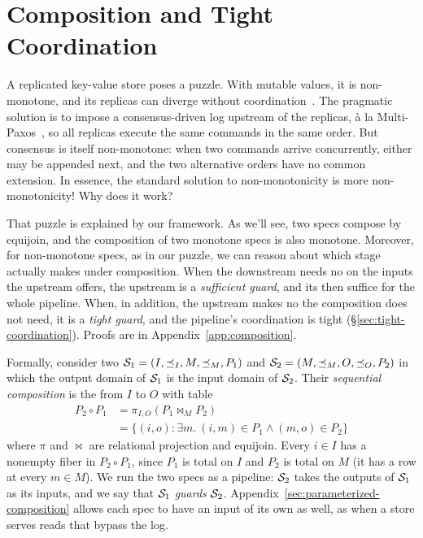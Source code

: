 \section{Composition and Tight Coordination}
\label{sec:composition}

A replicated key-value store poses a puzzle.  With mutable values, it is
non-monotone, and its replicas can diverge without coordination~\cite{alvaro2011bloom}. The pragmatic solution is
to impose a consensus-driven log upstream of the replicas, \`a la
Multi-Paxos~\cite{lamport2001paxos}, so all replicas execute the same commands
in the same order. But consensus is itself non-monotone: when two commands
arrive concurrently, either may be appended next, and the two alternative orders
have no common extension.  In essence, the standard solution to non-monotonicity
is more non-monotonicity! Why does it work?

That puzzle is explained by our framework.  As we'll see, two specs compose by equijoin,
and the composition of two monotone specs is also monotone. Moreover, for non-monotone specs,
as in our puzzle, we
can reason about which stage actually makes \commitments under composition.  When the
downstream needs no \commitment on the inputs the upstream offers, the
upstream is a \emph{sufficient guard}, and its \commitments then suffice for
the whole pipeline.  When, in addition, the upstream makes no \commitment the
composition does not need, it is a \emph{tight guard}, and the pipeline's
coordination is tight (\S\ref{sec:tight-coordination}).  Proofs are in
Appendix~\ref{app:composition}.
\label{sec:sequential-composition}

Formally, consider two \spectype[s]
${\mathcal{S}_1=(I,\preceq_I,M,\preceq_M,P_1)}$ and
${\mathcal{S}_2=(M,\preceq_M,O,\preceq_O,P_2)}$
in which the output domain of $\mathcal{S}_1$ is the input domain of $\mathcal{S}_2$.  Their
\emph{sequential composition} is the \spectype from $I$ to $O$ with table
\begin{equation}
\begin{split}
  P_2\circ P_1
  &=\pi_{I,O}(P_1\Join_M P_2)\\
  &=\{(i,o):\exists m.\ (i,m)\in P_1\land(m,o)\in P_2\}
\end{split}
  \label{eq:spec-composition}
\end{equation}
where $\pi$ and $\Join$ are relational projection and equijoin.  Every $i\in I$
has a nonempty fiber in $P_2\circ P_1$, since $P_1$ is total on $I$ and $P_2$ is
total on $M$ (it has a row at every $m\in M$).  We run the two specs as a pipeline: $\mathcal{S}_2$ takes the outputs of $\mathcal{S}_1$ as
its inputs, and we say that $\mathcal{S}_1$ \emph{guards} $\mathcal{S}_2$.
Appendix~\ref{sec:parameterized-composition} allows each spec to have an input
of its own as well, as when a store serves reads that bypass the log.

